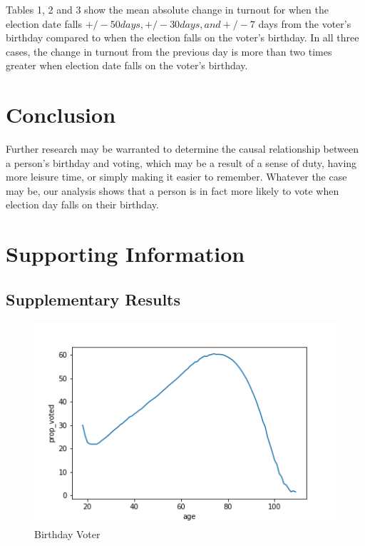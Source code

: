 \documentclass[12pt, letterpaper]{article}
\begin{document}




Tables 1, 2 and 3 show the mean absolute change in turnout for when the election date falls $+/- 50 days,+/-  30 days, and +/- 7$ days from the voter's birthday compared to when the election falls on the voter's birthday. In all three cases, the change in turnout from the previous day is more than two times greater when election date falls on the voter’s birthday.









\section{Conclusion}
Further research may be warranted to determine the causal relationship between a person's birthday and voting, which may be a result of a sense of duty, having more leisure time, or simply making it easier to remember. Whatever the case may be, our analysis shows that a person is in fact more likely to vote when election day falls on their birthday. 

\clearpage

  

\clearpage
\appendix
\renewcommand{\thesection}{SI \arabic{section}}
\renewcommand\thetable{\thesection.\arabic{table}}  
\renewcommand\thefigure{\thesection.\arabic{figure}}

\section{Supporting Information}

\subsection{Supplementary Results}
\begin{figure}[H]
\centering
 \includegraphics[scale=.7]{../figs/fig3_prop_voted_by_age.png}
 \caption{Birthday Voter}
 \label{fig:birthday}
\end{figure}
\end{document}
